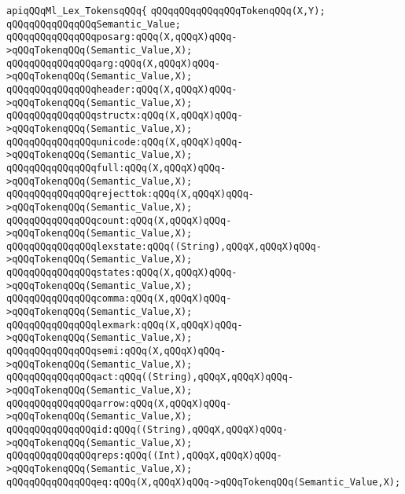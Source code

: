 \label{src/app/future-lex/src/frontends/lex/mythryl-lex.grammar.api}
\verb|apiqQQqMl_Lex_TokensqQQq{|\newline
\verb|qQQqqQQqqQQqqQQqTokenqQQq(X,Y);|\newline
\verb|qQQqqQQqqQQqqQQqSemantic_Value;|\newline
\verb|qQQqqQQqqQQqqQQqposarg:qQQq(X,qQQqX)qQQq->qQQqTokenqQQq(Semantic_Value,X);|\newline
\verb|qQQqqQQqqQQqqQQqarg:qQQq(X,qQQqX)qQQq->qQQqTokenqQQq(Semantic_Value,X);|\newline
\verb|qQQqqQQqqQQqqQQqheader:qQQq(X,qQQqX)qQQq->qQQqTokenqQQq(Semantic_Value,X);|\newline
\verb|qQQqqQQqqQQqqQQqstructx:qQQq(X,qQQqX)qQQq->qQQqTokenqQQq(Semantic_Value,X);|\newline
\verb|qQQqqQQqqQQqqQQqunicode:qQQq(X,qQQqX)qQQq->qQQqTokenqQQq(Semantic_Value,X);|\newline
\verb|qQQqqQQqqQQqqQQqfull:qQQq(X,qQQqX)qQQq->qQQqTokenqQQq(Semantic_Value,X);|\newline
\verb|qQQqqQQqqQQqqQQqrejecttok:qQQq(X,qQQqX)qQQq->qQQqTokenqQQq(Semantic_Value,X);|\newline
\verb|qQQqqQQqqQQqqQQqcount:qQQq(X,qQQqX)qQQq->qQQqTokenqQQq(Semantic_Value,X);|\newline
\verb|qQQqqQQqqQQqqQQqlexstate:qQQq((String),qQQqX,qQQqX)qQQq->qQQqTokenqQQq(Semantic_Value,X);|\newline
\verb|qQQqqQQqqQQqqQQqstates:qQQq(X,qQQqX)qQQq->qQQqTokenqQQq(Semantic_Value,X);|\newline
\verb|qQQqqQQqqQQqqQQqcomma:qQQq(X,qQQqX)qQQq->qQQqTokenqQQq(Semantic_Value,X);|\newline
\verb|qQQqqQQqqQQqqQQqlexmark:qQQq(X,qQQqX)qQQq->qQQqTokenqQQq(Semantic_Value,X);|\newline
\verb|qQQqqQQqqQQqqQQqsemi:qQQq(X,qQQqX)qQQq->qQQqTokenqQQq(Semantic_Value,X);|\newline
\verb|qQQqqQQqqQQqqQQqact:qQQq((String),qQQqX,qQQqX)qQQq->qQQqTokenqQQq(Semantic_Value,X);|\newline
\verb|qQQqqQQqqQQqqQQqarrow:qQQq(X,qQQqX)qQQq->qQQqTokenqQQq(Semantic_Value,X);|\newline
\verb|qQQqqQQqqQQqqQQqid:qQQq((String),qQQqX,qQQqX)qQQq->qQQqTokenqQQq(Semantic_Value,X);|\newline
\verb|qQQqqQQqqQQqqQQqreps:qQQq((Int),qQQqX,qQQqX)qQQq->qQQqTokenqQQq(Semantic_Value,X);|\newline
\verb|qQQqqQQqqQQqqQQqeq:qQQq(X,qQQqX)qQQq->qQQqTokenqQQq(Semantic_Value,X);|\newline
